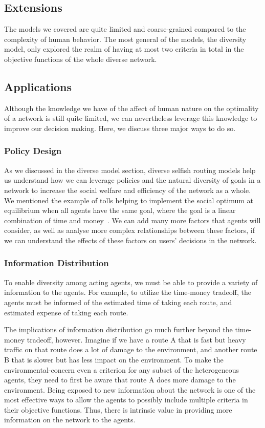\subsection{Extensions}

The models we covered are quite limited and coarse-grained compared to the complexity of human behavior. The most general of the models, the diversity model, only explored the realm of having at most two criteria in total in the objective functions of the whole diverse network.

\subsection{Applications}
Although the knowledge we have of the affect of human nature on the optimality of a network is still quite limited, we can nevertheless leverage this knowledge to improve our decision making. Here, we discuss three major ways to do so.

\subsubsection{Policy Design}
As we discussed in the diverse model section, diverse selfish routing models help us understand how we can leverage policies and the natural diversity of goals in a network to increase the social welfare and efficiency of the network as a whole. 
We mentioned the example of tolls helping to implement the social optimum at equilibrium when all agents have the same goal, where the goal is a linear combination of time and money~\cite{beckmann1956studies}. We can add many more factors that agents will consider, as well as analyse more complex relationships between these factors, if we can understand the effects of these factors on users' decisions in the network.

\subsubsection{Information Distribution}
To enable diversity among acting agents, we must be able to provide a variety of information to the agents. For example, to utilize the time-money tradeoff, the agents must be informed of the estimated time of taking each route, and estimated expense of taking each route. 

The implications of information distribution go much further beyond the time-money tradeoff, however. Imagine if we have a route A that is fast but heavy traffic on that route does a lot of damage to the environment, and another route B that is slower but has less impact on the environment. To make the environmental-concern even a criterion for any subset of the heterogeneous agents, they need to first be aware that route A does more damage to the environment. Being exposed to new information about the network is one of the most effective ways to allow the agents to possibly include multiple criteria in their objective functions. Thus, there is intrinsic value in providing more information on the network to the agents.

